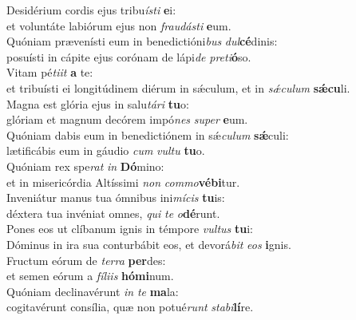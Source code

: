 \evenverse Desidérium cordis ejus tribu\textit{í}\textit{sti} \textbf{e}i:~\*\\
\evenverse et voluntáte labiórum ejus non \textit{frau}\textit{dá}\textit{sti} \textbf{e}um.\\
\oddverse Quóniam prævenísti eum in benedictióni\textit{bus} \textit{dul}\textbf{cé}dinis:~\*\\
\oddverse posuísti in cápite ejus corónam de lápi\textit{de} \textit{pre}\textit{ti}\textbf{ó}so.\\
\evenverse Vitam pé\textit{ti}\textit{it} \textbf{a} te:~\*\\
\evenverse et tribuísti ei longitúdinem diérum in sǽculum, et in \textit{sǽ}\textit{cu}\textit{lum} \textbf{sǽ}\textbf{cu}li.\\
\oddverse Magna est glória ejus in salu\textit{tá}\textit{ri} \textbf{tu}o:~\*\\
\oddverse glóriam et magnum decórem impó\textit{nes} \textit{su}\textit{per} \textbf{e}um.\\
\evenverse Quóniam dabis eum in benedictiónem in sǽ\textit{cu}\textit{lum} \textbf{sǽ}culi:~\*\\
\evenverse lætificábis eum in gáudio \textit{cum} \textit{vul}\textit{tu} \textbf{tu}o.\\
\oddverse Quóniam rex spe\textit{rat} \textit{in} \textbf{Dó}mino:~\*\\
\oddverse et in misericórdia Altíssimi \textit{non} \textit{com}\textit{mo}\textbf{vé}\textbf{bi}tur.\\
\evenverse Inveniátur manus tua ómnibus ini\textit{mí}\textit{cis} \textbf{tu}is:~\*\\
\evenverse déxtera tua invéniat omnes, \textit{qui} \textit{te} \textit{o}\textbf{dé}runt.\\
\oddverse Pones eos ut clíbanum ignis in témpore \textit{vul}\textit{tus} \textbf{tu}i:~\*\\
\oddverse Dóminus in ira sua conturbábit eos, et devorá\textit{bit} \textit{e}\textit{os} \textbf{i}gnis.\\
\evenverse Fructum eórum de \textit{ter}\textit{ra} \textbf{per}des:~\*\\
\evenverse et semen eórum a \textit{fí}\textit{li}\textit{is} \textbf{hó}\textbf{mi}num.\\
\oddverse Quóniam declinavérunt \textit{in} \textit{te} \textbf{ma}la:~\*\\
\oddverse cogitavérunt consília, quæ non potué\textit{runt} \textit{sta}\textit{bi}\textbf{lí}re.\\
